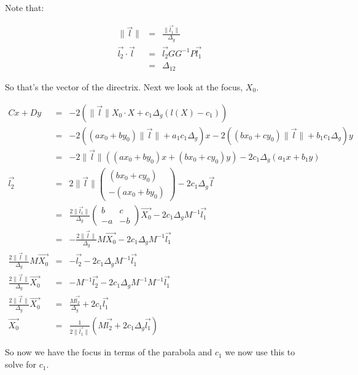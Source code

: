 \documentclass{article}
\begin{document}
Note that:

\begin{eqnarray}
\|\vec{l}\| & = & \frac{\|\vec{l_1}\|}{\Delta_g}\\
\vec{l_2}\cdot\vec{l} & = & \vec{l_2}GG^{-1}P\vec{l_1}\\
 & = & \Delta_{12}
\end{eqnarray}

So that's the vector of the directrix. Next we look at the focus, $X_0$.

\begin{eqnarray}
Cx + Dy   & = & - 2(\|\vec{l}\|X_0\cdot X  + c_1\Delta_g(l(X) - c_1))\\
          & = & - 2((ax_0 + by_0)\|\vec{l}\| + a_1c_1\Delta_g)x - 2((bx_0 + cy_0)\|\vec{l}\| + b_1c_1\Delta_g)y\nonumber\\
          & = & -2\|\vec{l}\|((ax_0 + by_0)x + (bx_0 + cy_0)y) - 2c_1\Delta_g(a_1x + b_1y)\\
\vec{l_2} & = & 2\|\vec{l}\|\left(\begin{array}{c} (bx_0 + cy_0)  \\ -(ax_0 + by_0)  \end{array}\right) - 2c_1\Delta_g\vec{l}\\
          & = & \frac{2\|\vec{l_1}\|}{\Delta_g}\left(\begin{array}{cc} b & c  \\ -a & -b  \end{array}\right)\vec{X_0} - 2c_1\Delta_gM^{-1}\vec{l_1}\\
          & = & -\frac{2\|\vec{l}\|}{\Delta_g}M\vec{X_0} - 2c_1\Delta_gM^{-1}\vec{l_1}\\
\frac{2\|\vec{l}\|}{\Delta_g}M\vec{X_0} & = & -\vec{l_2} - 2c_1\Delta_gM^{-1}\vec{l_1}\\
\frac{2\|\vec{l}\|}{\Delta_g}\vec{X_0} & = & -M^{-1}\vec{l_2} - 2c_1\Delta_gM^{-1}M^{-1}\vec{l_1}\\
\frac{2\|\vec{l}\|}{\Delta_g}\vec{X_0} & = & \frac{M\vec{l_2}}{\Delta_g} + 2c_1\vec{l_1}\\
\vec{X_0} & = & \frac{1}{2\|\vec{l_1}\|}\left( M\vec{l_2} + 2c_1\Delta_g\vec{l_1} \right)
\end{eqnarray}

So now we have the focus in terms of the parabola and $c_1$ we now use this to solve for $c_1$.
\end{document}
